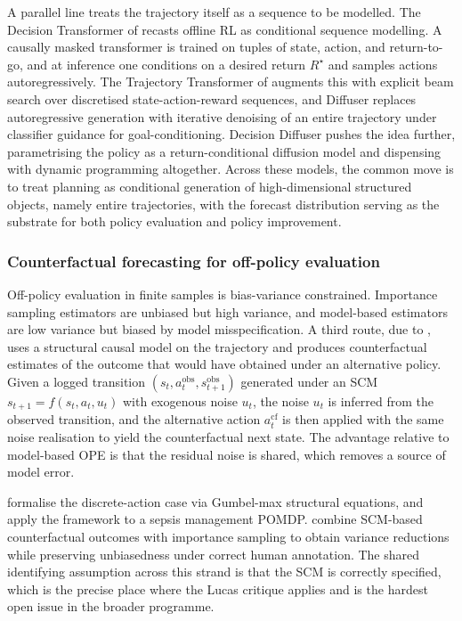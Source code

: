 A parallel line treats the trajectory itself as a sequence to be modelled. The
Decision Transformer of \citet{Chen2021DT} recasts offline RL as conditional sequence
modelling. A causally masked transformer is trained on tuples of state, action, and
return-to-go, and at inference one conditions on a desired return $R^\star$ and
samples actions autoregressively. The Trajectory Transformer of \citet{Janner2021TT}
augments this with explicit beam search over discretised state-action-reward
sequences, and Diffuser \citep{Janner2022diffuser} replaces autoregressive
generation with iterative denoising of an entire trajectory under classifier
guidance for goal-conditioning. Decision Diffuser \citep{Ajay2023} pushes the idea
further, parametrising the policy as a return-conditional diffusion model and
dispensing with dynamic programming altogether. Across these models, the common
move is to treat planning as conditional generation of high-dimensional structured
objects, namely entire trajectories, with the forecast distribution serving as the
substrate for both policy evaluation and policy improvement.

\subsubsection{Counterfactual forecasting for off-policy evaluation}
\label{sec:counterfactual_ope}

Off-policy evaluation in finite samples is bias-variance constrained. Importance
sampling estimators are unbiased but high variance, and model-based estimators are
low variance but biased by model misspecification. A third route, due to
\citet{Buesing2019}, uses a structural causal model on the trajectory and produces
counterfactual estimates of the outcome that would have obtained under an
alternative policy. Given a logged transition $(s_t, a_t^{\mathrm{obs}},
s_{t+1}^{\mathrm{obs}})$ generated under an SCM
$s_{t+1} = f(s_t, a_t, u_t)$ with exogenous noise $u_t$, the noise $u_t$ is inferred
from the observed transition, and the alternative action $a_t^{\mathrm{cf}}$ is then
applied with the same noise realisation to yield the counterfactual next state.
The advantage relative to model-based OPE is that the residual noise is shared,
which removes a source of model error.

\citet{Oberst2019} formalise the discrete-action case via Gumbel-max structural
equations, and apply the framework to a sepsis management POMDP. \citet{TangWiens2023}
combine SCM-based counterfactual outcomes with importance sampling to obtain
variance reductions while preserving unbiasedness under correct human annotation. The
shared identifying assumption across this strand is that the SCM is correctly
specified, which is the precise place where the Lucas critique applies and is the
hardest open issue in the broader programme.

